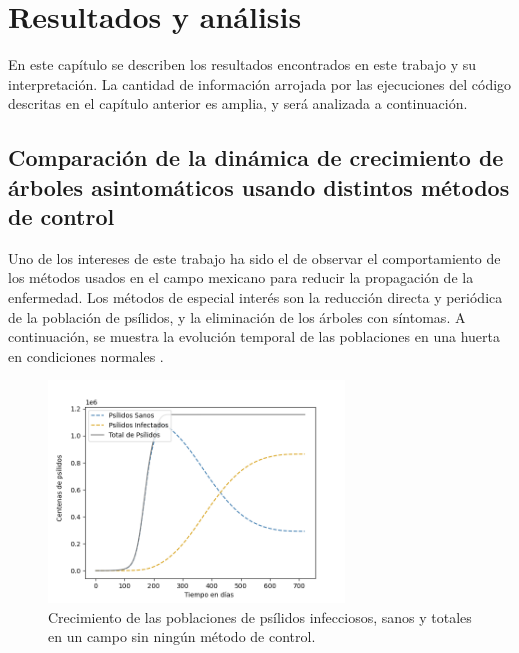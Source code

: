\chapter{Resultados y análisis}


En este capítulo se describen los resultados encontrados en este trabajo y su interpretación. La cantidad de información arrojada por las ejecuciones del código descritas en el capítulo anterior es amplia, y será analizada a continuación.

\section{Comparación de la dinámica de crecimiento de árboles asintomáticos usando distintos métodos de control}
Uno de los intereses de este trabajo ha sido el de observar el comportamiento de los métodos usados en el campo mexicano para reducir la propagación de la enfermedad. Los métodos de especial interés son la reducción directa y periódica de la población de psílidos, y la eliminación de los árboles con síntomas. A continuación, se muestra la evolución temporal de las poblaciones en una huerta en condiciones normales\cite{dala2019effect} \cite{robles2012protocolo}.
\begin{figure}[H]
\centering
\includegraphics[width=0.7\textwidth,keepaspectratio=true]{images/Imágenes C6/C6-0.png}
\caption{Crecimiento de las poblaciones de psílidos infecciosos, sanos y totales en un campo sin ningún método de control.}
\end{figure}
